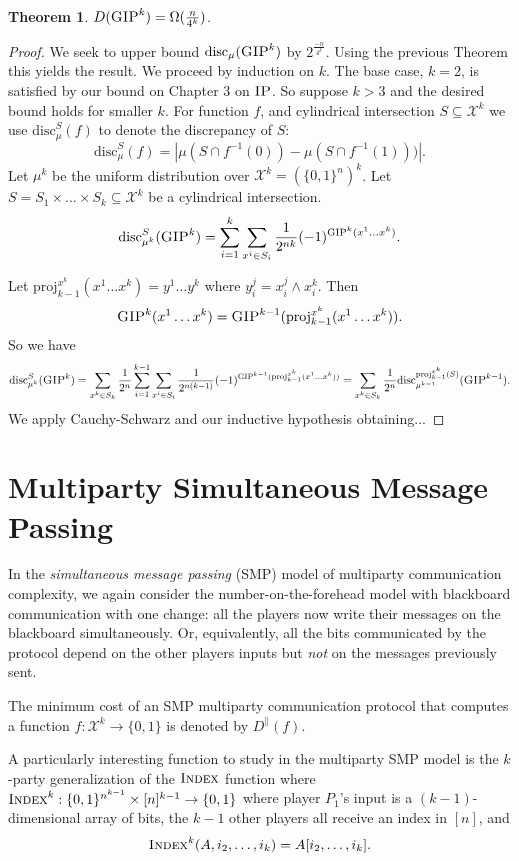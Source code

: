 \documentclass[11pt]{amsart}
\theoremstyle{plain}
\newtheorem{theorem}{Theorem}
\theoremstyle{definition}
\theoremstyle{plain}
\newcommand{\calX}{\mathcal{X}}
\newcommand{\disc}{\mathrm{disc}}
\newcommand{\GIP}{\textsc{GIP}}
\newcommand{\IP}{\textsc{IP}}
\newcommand{\Index}{\textsc{Index}}
\begin{document}
\begin{theorem}
$D(\GIP^k) = \Omega(\frac{n}{4^k})$.
\end{theorem}

\begin{proof}
We seek to upper bound $\disc_\mu(\GIP^k)$ by $2^{\frac{-n}{4^k}}$. Using the previous Theorem this yields the result. We proceed by induction on $k$. The base case, $k=2$, is satisfied by our bound on Chapter $3$ on $\IP$. So suppose $k>3$ and the  desired bound holds for smaller $k$. For function $f$, and cylindrical intersection $S\subseteq \calX^k$ we use $\disc_\mu^S(f)$ to denote the discrepancy of $S$:
$$\disc_\mu^S(f) = |\mu(S\cap f^{-1}(0)) - \mu(S\cap f^{-1}(1)))|.$$
Let $\mu^k$ be the uniform distribution over $\calX^k = (\{0,1\}^n)^k$. Let $S = S_1\times \dots \times S_k\subseteq \calX^k$ be a cylindrical intersection.
$$\disc_{\mu^k}^S(\GIP^k) = \sum_{i=1}^k\sum_{x^i \in S_i} \frac{1}{2^{nk}}(-1)^{\GIP^k(x^1\dots x^k)}.$$

Let $\text{proj}_{k-1}^{x^k}(x^1\dots x^k) = y^1\dots y^k$ where $y^j_i = x^j_i \wedge x^k_i$. Then
$$\GIP^k(x^1\dots x^k) = \GIP^{k-1}(\text{proj}_{k-1}^{x^k}(x^1\dots x^k)).$$
So we have
$$\disc_{\mu^k}^S(\GIP^k) = \sum_{x^k\in S_k}\frac{1}{2^n}\sum_{i=1}^{k-1}\sum_{x^i \in S_i}\frac{1}{2^{n(k-1)}}(-1)^{\GIP^{k-1}(\text{proj}_{k-1}^{x^k}(x^1\dots x^k))} = \sum_{x^k \in S_k}\frac{1}{2^n}\disc^{\text{proj}_{k-1}^{x^k}(S)}_{\mu^{k-1}}(\GIP^{k-1}). $$
We apply Cauchy-Schwarz and our inductive hypothesis obtaining...
\end{proof}



\newpage 
\section{Multiparty Simultaneous Message Passing}

In the \emph{simultaneous message passing} (SMP) model of multiparty communication complexity, we again consider the number-on-the-forehead model with blackboard communication with one change: all the players now write their messages on the blackboard simultaneously. Or, equivalently, all the bits communicated by the protocol depend on the other players inputs but \emph{not} on the messages previously sent.

The minimum cost of an SMP multiparty communication protocol that computes a function $f : \calX^k \to \{0,1\}$ is denoted by $D^\parallel(f)$.

A particularly interesting function to study in the multiparty SMP model is the $k$-party generalization of the $\Index$ function where $\Index^k : \{0,1\}^{n^{k-1}} \times [n]^{k-1} \to \{0,1\}$ where player $P_1$'s input is a $(k-1)$-dimensional array of bits, the $k-1$ other players all receive an index in $[n]$, and
\[
\Index^k(A,i_2,\ldots,i_k) = A[i_2,\ldots,i_k].
\]
\end{document}
